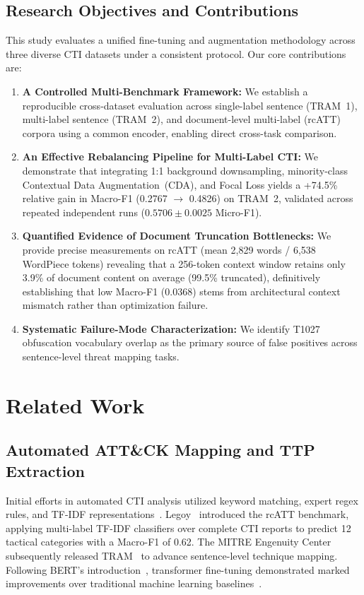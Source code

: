 \documentclass[runningheads]{llncs}
\begin{document}
\subsection{Research Objectives and Contributions}
This study evaluates a unified fine-tuning and augmentation methodology across three diverse CTI datasets under a consistent protocol. Our core contributions are:
\begin{enumerate}
  \item \textbf{A Controlled Multi-Benchmark Framework:} We establish a reproducible cross-dataset evaluation across single-label sentence (TRAM~1), multi-label sentence (TRAM~2), and document-level multi-label (rcATT) corpora using a common encoder, enabling direct cross-task comparison.
  \item \textbf{An Effective Rebalancing Pipeline for Multi-Label CTI:} We demonstrate that integrating 1:1 background downsampling, minority-class Contextual Data Augmentation~(CDA), and Focal Loss yields a +74.5\% relative gain in Macro-F1 (0.2767 $\to$ 0.4826) on TRAM~2, validated across repeated independent runs ($0.5706 \pm 0.0025$ Micro-F1).
  \item \textbf{Quantified Evidence of Document Truncation Bottlenecks:} We provide precise measurements on rcATT (mean 2,829 words / 6,538 WordPiece tokens) revealing that a 256-token context window retains only 3.9\% of document content on average (99.5\% truncated), definitively establishing that low Macro-F1 (0.0368) stems from architectural context mismatch rather than optimization failure.
  \item \textbf{Systematic Failure-Mode Characterization:} We identify T1027 obfuscation vocabulary overlap as the primary source of false positives across sentence-level threat mapping tasks.
\end{enumerate}

\section{Related Work}

\subsection{Automated ATT\&CK Mapping and TTP Extraction}
Initial efforts in automated CTI analysis utilized keyword matching, expert regex rules, and TF-IDF representations~\cite{husari2017ttpdrill}. Legoy~\cite{legoy2020rcatt} introduced the rcATT benchmark, applying multi-label TF-IDF classifiers over complete CTI reports to predict 12 tactical categories with a Macro-F1 of 0.62. The MITRE Engenuity Center subsequently released TRAM~\cite{mitre2023tram} to advance sentence-level technique mapping. Following BERT's introduction~\cite{devlin2019bert}, transformer fine-tuning demonstrated marked improvements over traditional machine learning baselines~\cite{li2024automated,orbinato2022automatic}.
\end{document}
